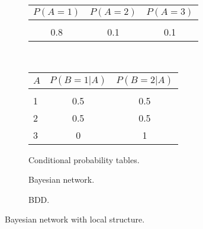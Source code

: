 \begin{figure}[H]
    \centering

    \hfill\begin{subfigure}[b]{150pt}
        \centering
        \begin{minipage}{150pt}
            \centering
            \setlength{\tabcolsep}{4pt}
            \begin{small}
                \begin{tabular}[t]{c | c | c}
                    \normalsize{$P(A=1)$} & \normalsize{$P(A=2)$} & \normalsize{$P(A=3)$}\\\hline
                    &&\\[-2ex]
                    0.8 & 0.1 & 0.1
                \end{tabular}
            \end{small}
        \end{minipage}\\\vspace{1em}%
        \begin{minipage}{130pt}
            \centering
            \setlength{\tabcolsep}{4pt}
            \begin{small}
                \begin{tabular}[t]{l || c | c }
                    \normalsize{$A$} & \normalsize{$P(B\!=\!1 | A)$} & \normalsize{$P(B\!=\!2 | A)$}\\\hline
                    &&\\[-2ex]
                    1 &  0.5 & 0.5\\
                    2 &  0.5 & 0.5\\
                    3 &  0 & 1\\
                \end{tabular}
            \end{small}
        \end{minipage}
        \caption{Conditional probability tables.}
        \label{subfig:cpts}
    \end{subfigure}\hfill
    \begin{subfigure}[b]{110pt}
        \centering
        
        \caption{Bayesian network.}
        \label{subfig:bn}
    \end{subfigure}\hfill
    \begin{subfigure}[b]{80pt}
        \centering
        \scalebox{0.9}{
        
        }

        \caption{BDD.}
        \label{subfig:bdd}
    \end{subfigure}\hfill


    \caption{Bayesian network with local structure.}
    \label{fig:bn}
\end{figure}

